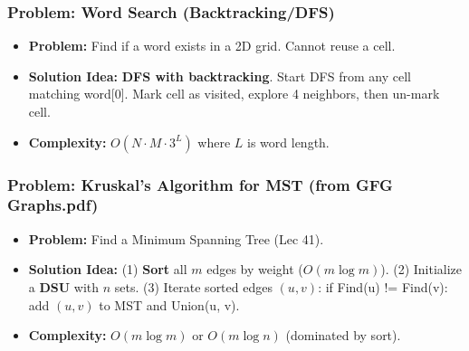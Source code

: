 \subsubsection{Problem: Word Search (Backtracking/DFS)}
\begin{itemize}
\item \textbf{Problem:} Find if a word exists in a 2D grid. Cannot reuse a cell.
\item \textbf{Solution Idea:} \textbf{DFS with backtracking}. Start DFS from any cell matching word[0]. Mark cell as visited, explore 4 neighbors, then un-mark cell.
\item \textbf{Complexity:} $O(N \cdot M \cdot 3^L)$ where $L$ is word length.
\end{itemize}

\subsubsection{Problem: Kruskal's Algorithm for MST (from GFG Graphs.pdf)}
\begin{itemize}
\item \textbf{Problem:} Find a Minimum Spanning Tree (Lec 41).
\item \textbf{Solution Idea:} (1) \textbf{Sort} all $m$ edges by weight ($O(m \log m)$). (2) Initialize a \textbf{DSU} with $n$ sets. (3) Iterate sorted edges $(u, v)$: if Find(u) != Find(v): add $(u, v)$ to MST and Union(u, v).
\item \textbf{Complexity:} $O(m \log m)$ or $O(m \log n)$ (dominated by sort).
\end{itemize}